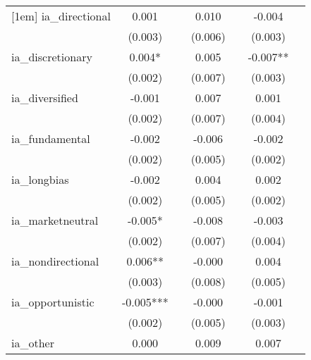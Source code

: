 {\begin{tabular}{l*{6}{c}}
[1em]
ia\_directional&       0.001   &               &       0.010   &               &      -0.004   &               \\
            &     (0.003)   &               &     (0.006)   &               &     (0.003)   &               \\
[1em]
ia\_discretionary&       0.004*  &               &       0.005   &               &      -0.007** &               \\
            &     (0.002)   &               &     (0.007)   &               &     (0.003)   &               \\
[1em]
ia\_diversified&      -0.001   &               &       0.007   &               &       0.001   &               \\
            &     (0.002)   &               &     (0.007)   &               &     (0.004)   &               \\
[1em]
ia\_fundamental&      -0.002   &               &      -0.006   &               &      -0.002   &               \\
            &     (0.002)   &               &     (0.005)   &               &     (0.002)   &               \\
[1em]
ia\_longbias &      -0.002   &               &       0.004   &               &       0.002   &               \\
            &     (0.002)   &               &     (0.005)   &               &     (0.002)   &               \\
[1em]
ia\_marketneutral&      -0.005*  &               &      -0.008   &               &      -0.003   &               \\
            &     (0.002)   &               &     (0.007)   &               &     (0.004)   &               \\
[1em]
ia\_nondirectional&       0.006** &               &      -0.000   &               &       0.004   &               \\
            &     (0.003)   &               &     (0.008)   &               &     (0.005)   &               \\
[1em]
ia\_opportunistic&      -0.005***&               &      -0.000   &               &      -0.001   &               \\
            &     (0.002)   &               &     (0.005)   &               &     (0.003)   &               \\
[1em]
ia\_other    &       0.000   &               &       0.009   &               &       0.007   &               \\

\end{tabular}}
